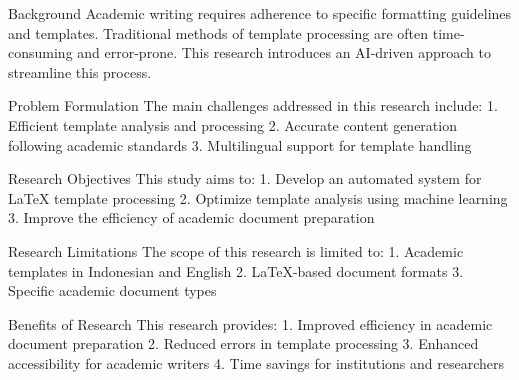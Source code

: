 \documentclass{uijm}
\begin{document}
Background
Academic writing requires adherence to specific formatting guidelines and templates. Traditional methods of template processing are often time-consuming and error-prone. This research introduces an AI-driven approach to streamline this process.

Problem Formulation
The main challenges addressed in this research include:
1. Efficient template analysis and processing
2. Accurate content generation following academic standards
3. Multilingual support for template handling

Research Objectives
This study aims to:
1. Develop an automated system for LaTeX template processing
2. Optimize template analysis using machine learning
3. Improve the efficiency of academic document preparation

Research Limitations
The scope of this research is limited to:
1. Academic templates in Indonesian and English
2. LaTeX-based document formats
3. Specific academic document types

Benefits of Research
This research provides:
1. Improved efficiency in academic document preparation
2. Reduced errors in template processing
3. Enhanced accessibility for academic writers
4. Time savings for institutions and researchers
\end{document}
